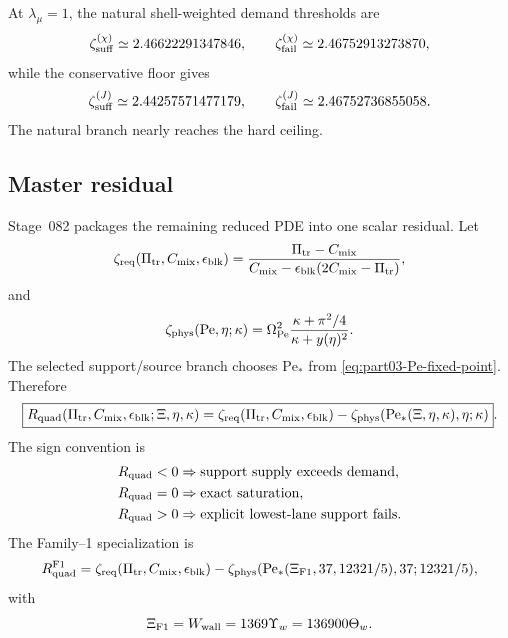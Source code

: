 At \(\lambda_\mu=1\), the natural shell-weighted demand thresholds are
\begin{equation}
\label{eq:part03-zeta-thresholds-chi}
\zeta_{\rm suff}^{(\chi)}\simeq2.46622291347846,
\qquad
\zeta_{\rm fail}^{(\chi)}\simeq2.46752913273870,
\end{equation}
while the conservative floor gives
\begin{equation}
\label{eq:part03-zeta-thresholds-J}
\zeta_{\rm suff}^{(J)}\simeq2.44257571477179,
\qquad
\zeta_{\rm fail}^{(J)}\simeq2.46752736855058.
\end{equation}
The natural branch nearly reaches the hard ceiling.

\subsection{Master residual}
\label{subsec:part03-master-residual}

Stage~082 packages the remaining reduced PDE into one scalar residual.  Let
\begin{equation}
\label{eq:part03-zeta-req-master}
\zeta_{\rm req}(\Pi_{\rm tr},C_{\rm mix},\epsilon_{\rm blk})
=\frac{\Pi_{\rm tr}-C_{\rm mix}}
{C_{\rm mix}-\epsilon_{\rm blk}(2C_{\rm mix}-\Pi_{\rm tr})},
\end{equation}
and
\begin{equation}
\label{eq:part03-zeta-phys-master}
\zeta_{\rm phys}(\mathrm{Pe},\eta;\kappa)
=\Omega_{\mathrm{Pe}}^2\frac{\kappa+\pi^2/4}{\kappa+y(\eta)^2}.
\end{equation}
The selected support/source branch chooses \(\mathrm{Pe}_*\) from \eqref{eq:part03-Pe-fixed-point}.  Therefore
\begin{equation}
\label{eq:part03-Rquad}
\boxed{
R_{\rm quad}(\Pi_{\rm tr},C_{\rm mix},\epsilon_{\rm blk};\Xi,
\eta,
\kappa)
=\zeta_{\rm req}(\Pi_{\rm tr},C_{\rm mix},\epsilon_{\rm blk})
-\zeta_{\rm phys}(\mathrm{Pe}_*(\Xi,
\eta,
\kappa),\eta;\kappa)}.
\end{equation}
The sign convention is
\begin{equation}
\label{eq:part03-Rquad-sign}
\begin{aligned}
R_{\rm quad}<0 &\Rightarrow \text{support supply exceeds demand},\\
R_{\rm quad}=0 &\Rightarrow \text{exact saturation},\\
R_{\rm quad}>0 &\Rightarrow \text{explicit lowest-lane support fails}.
\end{aligned}
\end{equation}
The Family--1 specialization is
\begin{equation}
\label{eq:part03-Rquad-F1}
R_{\rm quad}^{\rm F1}
=\zeta_{\rm req}(\Pi_{\rm tr},C_{\rm mix},\epsilon_{\rm blk})
-\zeta_{\rm phys}(\mathrm{Pe}_*(\Xi_{\rm F1},37,12321/5),37;12321/5),
\end{equation}
with
\begin{equation}
\label{eq:part03-XiF1}
\Xi_{\rm F1}=W_{\rm wall}=1369\Upsilon_w=136900\Theta_w.
\end{equation}


